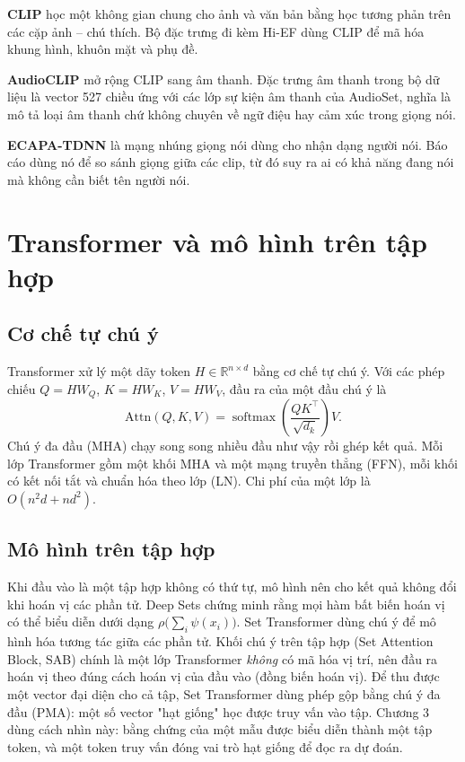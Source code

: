 \textbf{CLIP} \cite{radford2021clip} học một không gian chung cho ảnh và văn bản bằng học tương phản trên các cặp ảnh -- chú thích. Bộ đặc trưng đi kèm Hi-EF dùng CLIP để mã hóa khung hình, khuôn mặt và phụ đề.

\textbf{AudioCLIP} \cite{guzhov2022audioclip} mở rộng CLIP sang âm thanh. Đặc trưng âm thanh trong bộ dữ liệu là vector 527 chiều ứng với các lớp sự kiện âm thanh của AudioSet, nghĩa là mô tả loại âm thanh chứ không chuyên về ngữ điệu hay cảm xúc trong giọng nói.

\textbf{ECAPA-TDNN} \cite{desplanques2020ecapa} là mạng nhúng giọng nói dùng cho nhận dạng người nói. Báo cáo dùng nó để so sánh giọng giữa các clip, từ đó suy ra ai có khả năng đang nói mà không cần biết tên người nói.

\section{Transformer và mô hình trên tập hợp}

\subsection{Cơ chế tự chú ý}

Transformer \cite{vaswani2017attention} xử lý một dãy token $H \in \mathbb{R}^{n \times d}$ bằng cơ chế tự chú ý. Với các phép chiếu $Q = HW_Q$, $K = HW_K$, $V = HW_V$, đầu ra của một đầu chú ý là
\begin{equation}
	\mathrm{Attn}(Q, K, V) = \operatorname{softmax}\!\left(\frac{QK^\top}{\sqrt{d_k}}\right) V .
\end{equation}
Chú ý đa đầu (MHA) chạy song song nhiều đầu như vậy rồi ghép kết quả. Mỗi lớp Transformer gồm một khối MHA và một mạng truyền thẳng (FFN), mỗi khối có kết nối tắt và chuẩn hóa theo lớp (LN). Chi phí của một lớp là $O(n^2 d + n d^2)$.

\subsection{Mô hình trên tập hợp}

Khi đầu vào là một tập hợp không có thứ tự, mô hình nên cho kết quả không đổi khi hoán vị các phần tử. Deep Sets \cite{zaheer2017deep} chứng minh rằng mọi hàm bất biến hoán vị có thể biểu diễn dưới dạng $\rho\big(\sum_i \psi(x_i)\big)$. Set Transformer \cite{lee2019set} dùng chú ý để mô hình hóa tương tác giữa các phần tử. Khối chú ý trên tập hợp (Set Attention Block, SAB) chính là một lớp Transformer \emph{không} có mã hóa vị trí, nên đầu ra hoán vị theo đúng cách hoán vị của đầu vào (đồng biến hoán vị). Để thu được một vector đại diện cho cả tập, Set Transformer dùng phép gộp bằng chú ý đa đầu (PMA): một số vector "hạt giống" học được truy vấn vào tập. Chương 3 dùng cách nhìn này: bằng chứng của một mẫu được biểu diễn thành một tập token, và một token truy vấn đóng vai trò hạt giống để đọc ra dự đoán.

